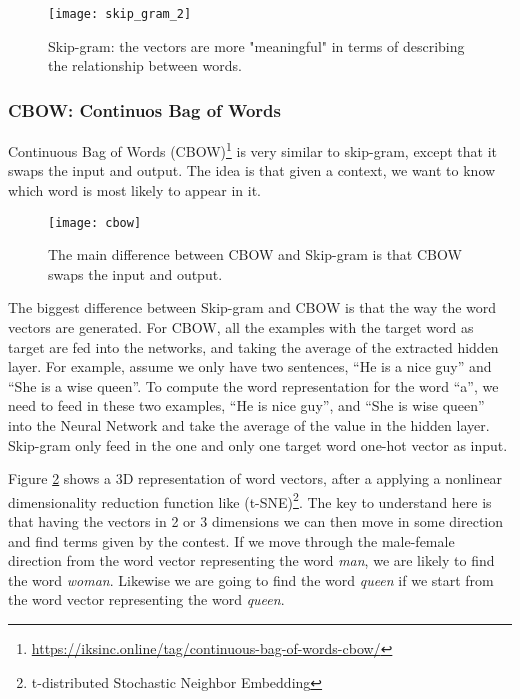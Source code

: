 \begin{figure}[ht]
	\centering
	\texttt{[image: skip\_gram\_2]}
	\caption[Skip-gram relationship between words]{Skip-gram: the vectors are more "meaningful" in terms of describing the relationship between words.}
	\label{fig:skip_gram_2}
\end{figure}

\subsubsection{CBOW: Continuos Bag of Words}

Continuous Bag of Words (CBOW)\footnote{\url{https://iksinc.online/tag/continuous-bag-of-words-cbow/}} is very similar to skip-gram, except that it swaps the input and output. The idea is that given a context, we want to know which word is most likely to appear in it.

\begin{figure}[ht]
	\centering
	\texttt{[image: cbow]}
	\caption[CBOW and Skip-gram]{The main difference between CBOW and Skip-gram is that CBOW swaps the input and output.}
	\label{fig:cbow}
\end{figure}


The biggest difference between Skip-gram and CBOW is that the way the word vectors are generated. For CBOW, all the examples with the target word as target are fed into the networks, and taking the average of the extracted hidden layer. For example, assume we only have two sentences, “He is a nice guy” and “She is a wise queen”. To compute the word representation for the word “a”, we need to feed in these two examples, “He is nice guy”, and “She is wise queen” into the Neural Network and take the average of the value in the hidden layer. Skip-gram only feed in the one and only one target word one-hot vector as input.

Figure \ref{fig:cbow} shows a 3D representation of word vectors, after a applying a nonlinear dimensionality reduction function like (t-SNE)\footnote{t-distributed Stochastic Neighbor Embedding}\cite{maaten2008visualizing}. The key to understand here is that having the vectors in 2 or 3 dimensions we can then move in some direction and find terms given by the contest. If we move through the male-female direction from the word vector representing the word \textit{man}, we are likely to find the word \textit{woman}. Likewise we are going to find the word \textit{queen} if we start from the word vector representing the word \textit{queen}.


